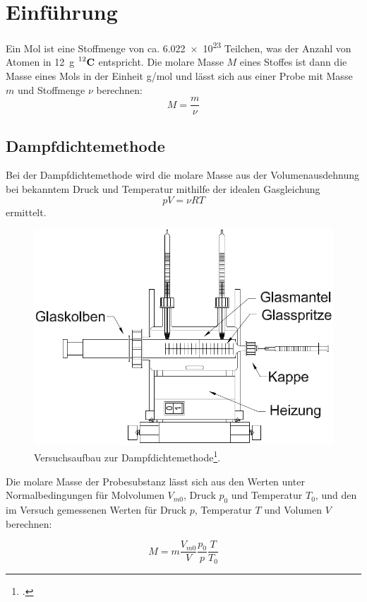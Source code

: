 \section{Einführung}
Ein Mol ist eine Stoffmenge von ca. \num{6.022e23} Teilchen, was der Anzahl von Atomen in \SI{12}{g} $\prescript{12}{}{\mathbf{C}}$ entspricht.
Die molare Masse $M$ eines Stoffes ist dann die Masse eines Mols in der Einheit \si{g/\mole} und lässt sich aus einer Probe mit Masse $m$ und Stoffmenge $\nu$ berechnen:
\begin{equation}
	M=\frac{m}{\nu}
\label{eq:molmasse}
\end{equation}

\subsection{Dampfdichtemethode}
Bei der Dampfdichtemethode wird die molare Masse aus der Volumenausdehnung bei bekanntem Druck und Temperatur mithilfe der idealen Gasgleichung
\begin{equation}
	pV=\nu RT
\label{eq:gasgleichung}
\end{equation}
ermittelt.

\begin{figure}[h]
  \centering
  \includegraphics[width=.7\textwidth]{res/dampfdichte}
  \caption{Versuchsaufbau zur Dampfdichtemethode\footcite{anleitung-ss2015}.}
  \label{fig:dampfdichteaufbau}
\end{figure}
Die molare Masse der Probesubstanz lässt sich aus den Werten unter Normalbedingungen für Molvolumen $V_{m0}$, Druck $p_0$ und Temperatur $T_0$, und den im Versuch gemessenen Werten für Druck $p$, Temperatur $T$ und Volumen $V$ berechnen:  

\begin{equation}
	M=m\frac{V_{m0}}{V}\frac{p_0}{p}\frac{T}{T_0}
\label{eq:dampfdichte}
\end{equation}

